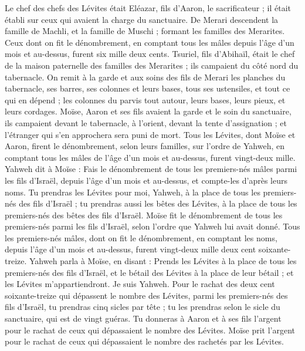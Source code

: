 \begin{multicols}{2}
Le chef des chefs des Lévites était Eléazar, fils d'Aaron, le sacrificateur ; il était établi sur ceux qui avaient la charge du sanctuaire.
De Merari descendent la famille de Machli, et la famille de Muschi ; formant les familles des Merarites.
Ceux dont on fit le dénombrement, en comptant tous les mâles depuis l'âge d'un mois et au-dessus, furent six mille deux cents.
Tsuriel, fils d'Abihaïl, était le chef de la maison paternelle des familles des Merarites ; ils campaient du côté nord du tabernacle.
On remit à la garde et aux soins des fils de Merari les planches du tabernacle, ses barres, ses colonnes et leurs bases, tous ses ustensiles, et tout ce qui en dépend ;
les colonnes du parvis tout autour, leurs bases, leurs pieux, et leurs cordages.
Moïse, Aaron et ses fils avaient la garde et le soin du sanctuaire, ils campaient devant le tabernacle, à l’orient, devant la tente d'assignation ; et l’étranger qui s'en approchera sera puni de mort.
Tous les Lévites, dont Moïse et Aaron, firent le dénombrement, selon leurs familles, sur l’ordre de Yahweh, en comptant tous les mâles de l'âge d'un mois et au-dessus, furent vingt-deux mille.
Yahweh dit à Moïse : Fais le dénombrement de tous les premiers-nés mâles parmi les fils d'Israël, depuis l'âge d'un mois et au-dessus, et compte-les d’après leurs noms.
Tu prendras les Lévites pour moi, Yahweh, à la place de tous les premiers-nés des fils d'Israël ; tu prendras aussi les bêtes des Lévites, à la place de tous les premiers-nés des bêtes des fils d'Israël.
Moïse fit le dénombrement de tous les premiers-nés parmi les fils d’Israël, selon l’ordre que Yahweh lui avait donné.
Tous les premiers-nés mâles, dont on fit le dénombrement, en comptant les noms, depuis l'âge d'un mois et au-dessus, furent vingt-deux mille deux cent soixante-treize.
Yahweh parla à Moïse, en disant :
Prends les Lévites à la place de tous les premiers-nés des fils d'Israël, et le bétail des Lévites à la place de leur bétail ; et les Lévites m’appartiendront. Je suis Yahweh.
Pour le rachat des deux cent soixante-treize qui dépassent le nombre des Lévites, parmi les premiers-nés des fils d’Israël,
tu prendras cinq sicles par tête ; tu les prendras selon le sicle du sanctuaire, qui est de vingt guéras.
Tu donneras à Aaron et à ses fils l'argent pour le rachat de ceux qui dépassaient le nombre des Lévites.
Moïse prit l'argent pour le rachat de ceux qui dépassaient le nombre des rachetés par les Lévites.

\end{multicols}
